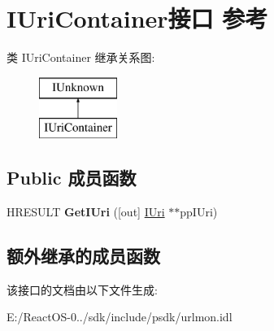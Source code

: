 \hypertarget{interface_i_uri_container}{}\section{I\+Uri\+Container接口 参考}
\label{interface_i_uri_container}
类 I\+Uri\+Container 继承关系图\+:\begin{figure}[H]
\begin{center}
\leavevmode
\includegraphics[height=2.000000cm]{interface_i_uri_container}
\end{center}
\end{figure}
\subsection*{Public 成员函数}
\begin{DoxyCompactItemize}
\item 
\mbox{\label{interface_i_uri_container_a25d2c4a51161124d59d18dbe90c4fb16}} 
H\+R\+E\+S\+U\+LT {\bfseries Get\+I\+Uri} (\mbox{[}out\mbox{]} \hyperlink{interface_i_uri}{I\+Uri} $\ast$$\ast$pp\+I\+Uri)
\end{DoxyCompactItemize}
\subsection*{额外继承的成员函数}


该接口的文档由以下文件生成\+:\begin{DoxyCompactItemize}
\item 
E\+:/\+React\+O\+S-\/0../sdk/include/psdk/urlmon.\+idl\end{DoxyCompactItemize}
